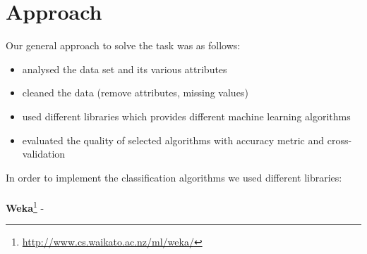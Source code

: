\section{Approach}
\label{approach}


Our general approach to solve the task was as follows:
\\
\begin{itemize}
	\item[\textbullet] analysed the data set and its various attributes
	\item[\textbullet] cleaned the data (remove attributes, missing values)
	\item[\textbullet] used different libraries which provides different machine learning algorithms
	\item[\textbullet] evaluated the quality of selected algorithms with accuracy metric and cross-validation
\end{itemize}
In order to implement the classification algorithms we used different libraries: \\
\\
\textbf{Weka}\footnote{\url{http://www.cs.waikato.ac.nz/ml/weka/}} -
